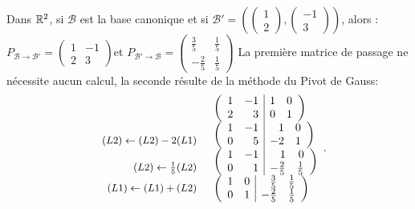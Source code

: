 \documentclass{book}
\begin{document}
 \begin{Exemple}
Dans $\mathbb{R} ^2$, si $\mathcal{B}$ est la base canonique et si $\mathcal{B}' = \left( \begin{pmatrix}
1\\2
\end{pmatrix},\begin{pmatrix}
-1\\3
\end{pmatrix}\right) $, alors :\\
$P_{\mathcal{B}\to\mathcal{B}'}=\begin{pmatrix}
1&-1\\2&3
\end{pmatrix}$et $P_{\mathcal{B}'\to\mathcal{B}}=\begin{pmatrix}
\frac 35&\frac 15\\-\frac 25&\frac 15
\end{pmatrix}$
La première matrice de passage ne nécessite aucun calcul, la seconde résulte de la méthode du Pivot de Gauss:
$$\begin{array}{rl}
&\left({\begin{array}{rr|rr}1 &-1& 1 & 0\\ 2 & 3 &0&1 \end{array}}\right)\\
\begin{small}\begin{array}{r} \\(L2)\leftarrow (L2)-2(L1) \end{array}\end{small}&\left({\begin{array}{rr|rr}1 &-1& 1 & 0\\ 0 & 5 &-2&1 \end{array}}\right)\\
\begin{small}\begin{array}{r} \\(L2)\leftarrow \frac 1 5 (L2) \end{array}\end{small}&\left({\begin{array}{rr|rr}1 &-1& 1 & 0\\ 0 & 1 &- \frac 2 5& \frac 1 5 \end{array}}\right)\\
\begin{small}\begin{array}{r}(L1)\leftarrow (L1)+(L2)  \\ \end{array}\end{small}&\left({\begin{array}{rr|rr}1 &0&  \frac 3 5  &  \frac 1 5\\ 0 & 1 &- \frac 2 5& \frac 1 5 \end{array}}\right)
\end{array}.$$
 \end{Exemple}
\end{document}
